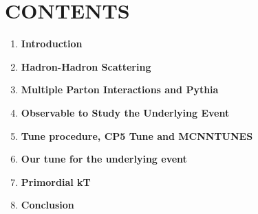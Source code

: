 \documentclass[10pt]{article}
\begin{document}
\section*{CONTENTS}

\begin{enumerate}[label=\arabic*)]
\item \textbf{Introduction} 
\item \textbf{Hadron-Hadron Scattering}
\item \textbf{Multiple Parton Interactions and Pythia}
\item \textbf{Observable to Study the Underlying Event}
\item \textbf{Tune procedure, CP5 Tune and MCNNTUNES}
\item \textbf{Our tune for the underlying event}
\item \textbf{Primordial kT}
\item \textbf{Conclusion}
\end{enumerate}
\end{document}
